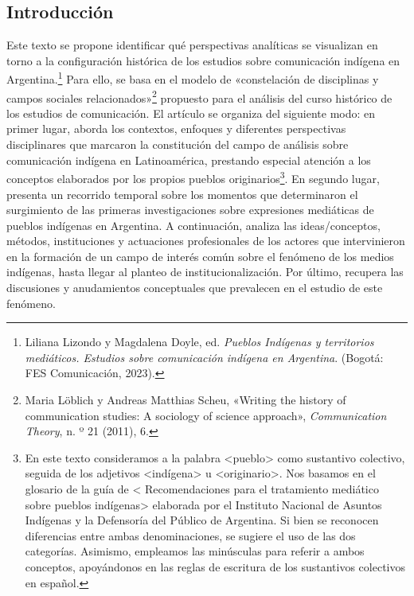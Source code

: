 \documentclass{tufte-handout}
\begin{document}
\begin{titlepage}
\vspace{.1in}

\hypertarget{introduccin}{%
\section{Introducción}\label{introduccin}}

Este texto se propone identificar qué perspectivas analíticas se
visualizan en torno a la configuración histórica de los estudios sobre
comunicación indígena en Argentina.\footnote{Liliana Lizondo y Magdalena
  Doyle, ed. \emph{Pueblos Indígenas y territorios mediáticos. Estudios
  sobre comunicación indígena en Argentina}. (Bogotá: FES Comunicación,
  2023).} Para ello, se basa en el modelo de «constelación de
disciplinas y campos sociales relacionados»\footnote{Maria Löblich y
  Andreas Matthias Scheu, «Writing the history of communication studies:
  A sociology of science approach», \emph{Communication Theory}, n. º 21
  (2011), 6.} propuesto para el análisis del curso histórico de los
estudios de comunicación. El artículo se organiza del siguiente modo: en
primer lugar, aborda los contextos, enfoques y diferentes perspectivas
disciplinares que marcaron la constitución del campo de análisis sobre
comunicación indígena en Latinoamérica, prestando especial atención a
los conceptos elaborados por los propios pueblos originarios\footnote{En
  este texto consideramos a la palabra \textless pueblo\textgreater{}
  como sustantivo colectivo, seguida de los adjetivos
  \textless indígena\textgreater{} u \textless originario\textgreater.
  Nos basamos en el glosario de la guía de \textless{} Recomendaciones
  para el tratamiento mediático sobre pueblos indígenas\textgreater{}
  elaborada por el Instituto Nacional de Asuntos Indígenas y la
  Defensoría del Público de Argentina. Si bien se reconocen diferencias
  entre ambas denominaciones, se sugiere el uso de las dos categorías.
  Asimismo, empleamos las minúsculas para referir a ambos conceptos,
  apoyándonos en las reglas de escritura de los sustantivos colectivos
  en español.}. En segundo lugar, presenta un recorrido temporal sobre
los momentos que determinaron el surgimiento de las primeras
investigaciones sobre expresiones mediáticas de pueblos indígenas en
Argentina. A continuación, analiza las ideas/conceptos, métodos,
instituciones y actuaciones profesionales de los actores que
intervinieron en la formación de un campo de interés común sobre el
fenómeno de los medios indígenas, hasta llegar al planteo de
institucionalización. Por último, recupera las discusiones y
anudamientos conceptuales que prevalecen en el estudio de este fenómeno.



\end{titlepage}
\end{document}
